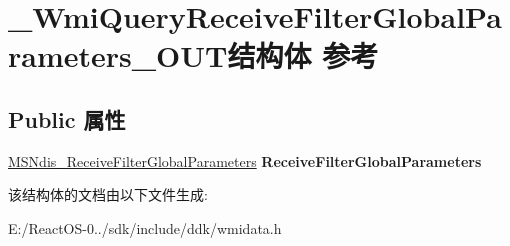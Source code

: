 \hypertarget{struct___wmi_query_receive_filter_global_parameters___o_u_t}{}\section{\+\_\+\+Wmi\+Query\+Receive\+Filter\+Global\+Parameters\+\_\+\+O\+U\+T结构体 参考}
\label{struct___wmi_query_receive_filter_global_parameters___o_u_t}
\subsection*{Public 属性}
\begin{DoxyCompactItemize}
\item 
\mbox{\label{struct___wmi_query_receive_filter_global_parameters___o_u_t_a584c3198a6891b7d8c369b11eeb15e33}} 
\hyperlink{struct___m_s_ndis___receive_filter_global_parameters}{M\+S\+Ndis\+\_\+\+Receive\+Filter\+Global\+Parameters} {\bfseries Receive\+Filter\+Global\+Parameters}
\end{DoxyCompactItemize}


该结构体的文档由以下文件生成\+:\begin{DoxyCompactItemize}
\item 
E\+:/\+React\+O\+S-\/0../sdk/include/ddk/wmidata.\+h\end{DoxyCompactItemize}
